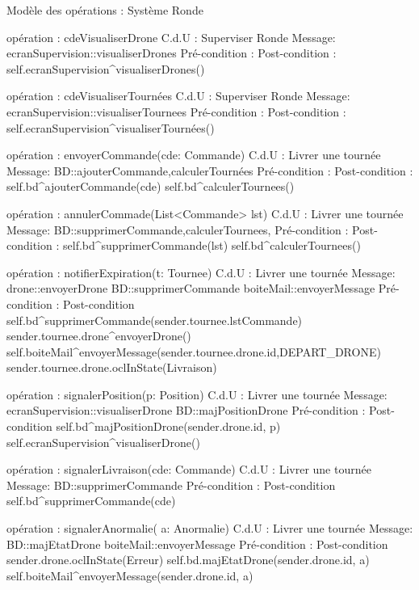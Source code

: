 ﻿Modèle des opérations : Système Ronde


opération : cdeVisualiserDrone
C.d.U : Superviser Ronde
Message: 
        ecranSupervision::{visualiserDrones}
Pré-condition : 
Post-condition :
self.ecranSupervision^visualiserDrones()




 opération : cdeVisualiserTournées
C.d.U : Superviser Ronde
Message:
ecranSupervision::{visualiserTournees} 
Pré-condition : 
Post-condition :
self.ecranSupervision^visualiserTournées()




 opération : envoyerCommande(cde: Commande)
C.d.U : Livrer une tournée
Message:
BD::{ajouterCommande,calculerTournées} 
Pré-condition : 
Post-condition :
        self.bd^ajouterCommande(cde)
self.bd^calculerTournees()




opération : annulerCommade(List<Commande> lst)
C.d.U : Livrer une tournée
Message:
BD::{supprimerCommande,calculerTournees,} 
Pré-condition : 
Post-condition :
self.bd^supprimerCommande(lst)
self.bd^calculerTournees()










opération : notifierExpiration(t: Tournee)
C.d.U : Livrer une tournée
Message:
drone::{envoyerDrone}
BD::{supprimerCommande}
boiteMail::{envoyerMessage} 
Pré-condition : 
Post-condition 
self.bd^supprimerCommande(sender.tournee.lstCommande)
sender.tournee.drone^envoyerDrone()
self.boiteMail^envoyerMessage(sender.tournee.drone.id,DEPART_DRONE)
sender.tournee.drone.oclInState(Livraison)






opération : signalerPosition(p: Position)
C.d.U : Livrer une tournée
Message:
ecranSupervision::{visualiserDrone}
BD::{majPositionDrone} 
Pré-condition : 
Post-condition 
self.bd^majPositionDrone(sender.drone.id, p)
self.ecranSupervision^visualiserDrone()




opération : signalerLivraison(cde: Commande)
C.d.U : Livrer une tournée
Message:
BD::{supprimerCommande} 
Pré-condition : 
Post-condition 
self.bd^supprimerCommande(cde)






opération : signalerAnormalie( a: Anormalie)
C.d.U : Livrer une tournée
Message:
BD::{majEtatDrone}
boiteMail::{envoyerMessage}  
Pré-condition : 
Post-condition 
sender.drone.oclInState(Erreur)
self.bd.majEtatDrone(sender.drone.id, a)
self.boiteMail^envoyerMessage(sender.drone.id, a)




